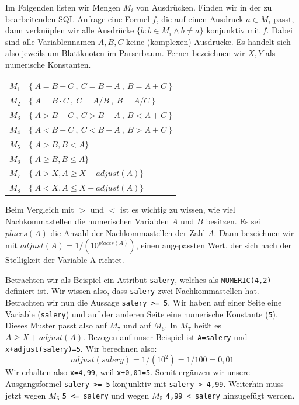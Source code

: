 Im Folgenden listen wir Mengen $M_i$ von Ausdrücken. Finden wir in der zu bearbeitenden SQL-Anfrage eine Formel $f$, die auf einen Ausdruck $a\in M_i$ passt, dann verknüpfen wir alle Ausdrücke $\{b : b\in M_i \wedge b \neq a\}$ konjunktiv mit $f$. Dabei sind alle Variablennamen $A,B,C$ keine (komplexen) Ausdrücke. Es handelt sich also jeweils um Blattknoten im Parserbaum. Ferner bezeichnen wir $X,Y$ als numerische Konstanten.\\

\begin{tabular}{ll}
$M_1$ & $\{\ A=B-C\ ,\ C=B-A\ ,\ B=A+C\ \}$\\
$M_2$ & $\{\ A=B\cdot C\ ,\ C=A / B\ ,\ B=A / C\ \}$\\
$M_3$ & $\{\ A>B-C\ ,\ C>B-A\ ,\ B<A+C\ \}$\\
$M_4$ & $\{\ A<B-C\ ,\ C<B-A\ ,\ B>A+C\ \}$\\
$M_5$ & $\{\ A>B, B<A \}$\\
$M_6$ & $\{\ A\geq B, B\leq A \}$\\
$M_7$ & $\{\ A>X, A\geq X+\mathit{adjust}(A) \}$\\
$M_8$ & $\{\ A<X, A\leq X-\mathit{adjust}(A) \}$\\

\end{tabular}

Beim Vergleich mit $>$ und $<$ ist es wichtig zu wissen, wie viel Nachkommastellen die numerischen Variablen $A$ und $B$ besitzen. Es sei $\mathit{places}(A)$ die Anzahl der Nachkommastellen der Zahl $A$. Dann bezeichnen wir mit $\mathit{adjust}(A) = 1 / (10^{\mathit{places}(A)})$, einen angepassten Wert, der sich nach der Stelligkeit der Variable A richtet.

Betrachten wir als Beispiel ein Attribut \verb|salery|, welches als \verb|NUMERIC(4,2)| definiert ist. Wir wissen also, dass \verb|salery| zwei Nachkommastellen hat. Betrachten wir nun die Aussage \verb|salery >= 5|.
Wir haben auf einer Seite eine Variable (\verb|salery|) und auf der anderen Seite eine numerische Konstante (\verb|5|). Dieses Muster passt also auf $M_7$ und auf $M_6$. In $M_7$ heißt es $A\geq X+\mathit{adjust}(A)$. Bezogen auf unser Beispiel ist \verb|A=salery| und \verb|x+adjust(salery)=5|. Wir berechnen also: 
$$\mathit{adjust}(\mathit{salery}) = 1 / (10^{2}) = 1/100 = 0,01$$
Wir erhalten also \verb|x=4,99|, weil \verb|x+0,01=5|. Somit ergänzen wir unsere Ausgangsformel \verb|salery >= 5| konjunktiv mit \verb|salery > 4,99|. Weiterhin muss jetzt wegen $M_6$ \verb|5 <= salery| und wegen $M_5$ \verb|4,99 < salery| hinzugefügt werden.

